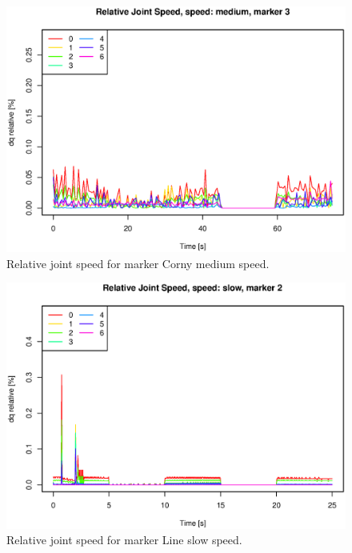 \begin{figure}[H]\centering\includegraphics[width=\fullImageWidth]{graphics/rovi_robot_joint_speed_medium_marker3.eps}  \caption{Relative joint speed for marker Corny  medium speed.}\label{fig:rovi_joint_speed_M_Corny } \end{figure}
\begin{figure}[H]\centering\includegraphics[width=\fullImageWidth]{graphics/rovi_robot_joint_speed_slow_marker2.eps}    \caption{Relative joint speed for marker Line   slow speed.  }\label{fig:rovi_joint_speed_S_Line  } \end{figure}
